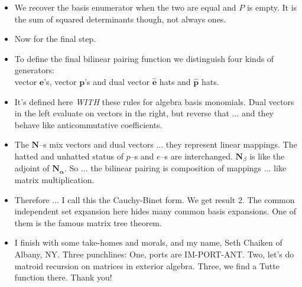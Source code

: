 \documentclass[14pt]{extarticle}
\begin{document}
{\begin{itemize}
\item
  We recover the basis enumerator when the two are equal and $P$ is empty.  It
  is the sum of squared determinants though, not always ones.

\item Now for the final step.

\item
  To define the final bilinear pairing function 
  we distinguish 
  four kinds of generators:\\
  vector $\mathbf{e}$'s, vector $\mathbf{p}$'s and
dual vector $\widehat{\mathbf{e}}$ hats and $\widehat{\mathbf{p}}$ hats.  

\item
  It's defined here \emph{WITH} these rules for algebra basis monomials.  Dual vectors
  in the left evaluate on vectors in the right, but reverse that ... and
  they behave like anticommutative coefficients.

\item
  The $\mathbf{N}$--s mix vectors and dual vectors ... they represent linear mappings.
  The hatted and unhatted status of $p$--s and $e$--s are interchanged.
  $\mathbf{N}_\beta$ is like the adjoint of $\mathbf{N_\alpha}$.  So ... the
  bilinear pairing is composition of mappings  ... like matrix multiplication.

\item
  Therefore ... I call this the Cauchy-Binet form.  We get result 2.
  The common independent set expansion here hides many common basis
  expansions.  One of them is the famous matrix tree theorem.

\item
  I finish with some take-homes and morals, and my name, Seth Chaiken
  of Albany, NY.
  Three punchlines:  One, ports are IM-PORT-ANT.
  Two, let's do matroid recursion on matrices in exterior algebra.
  Three, we find a Tutte function there.
  Thank you!
  \end{itemize}
}
\end{document}
